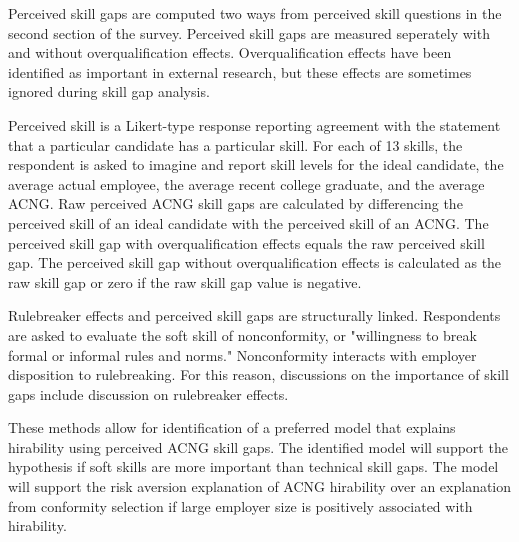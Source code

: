 \documentclass[review]{elsarticle}
\begin{document}
Perceived skill gaps are computed two ways from perceived skill questions in the second section of the survey.
Perceived skill gaps are measured seperately with and without overqualification effects.
Overqualification effects have been identified as important in external research\cite{green2007there, raybould2005over}, but these effects are sometimes ignored during skill gap analysis\cite{blake_2018}.

Perceived skill is a Likert-type response reporting agreement with the statement that a particular candidate has a particular skill.
For each of 13 skills, the respondent is asked to imagine and report skill levels for the ideal candidate,
the average actual employee,
the average recent college graduate,
and the average ACNG.
Raw perceived ACNG skill gaps are calculated by differencing the perceived skill of an ideal candidate with the perceived skill of an ACNG.
The perceived skill gap with overqualification effects equals the raw perceived skill gap.
The perceived skill gap without overqualification effects is calculated as the raw skill gap or zero if the raw skill gap value is negative.

Rulebreaker effects and perceived skill gaps are structurally linked.
Respondents are asked to evaluate the soft skill of nonconformity, or "willingness to break formal or informal rules and norms."
Nonconformity interacts with employer disposition to rulebreaking.
For this reason, discussions on the importance of skill gaps include discussion on rulebreaker effects.

These methods allow for identification of a preferred model that explains hirability using perceived ACNG skill gaps.
The identified model will support the hypothesis if soft skills are more important than technical skill gaps. %
The model will support the risk aversion explanation of ACNG hirability over an explanation from conformity selection if large employer size is positively associated with hirability.
\end{document}
